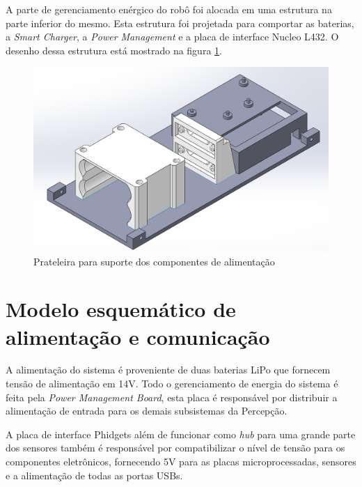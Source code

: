 	
	
	A parte de gerenciamento enérgico do robô foi alocada em uma estrutura na parte inferior do mesmo. Esta estrutura foi projetada para comportar as baterias, a \textit{Smart Charger}, a \textit{Power Management} e a placa de interface Nucleo L432. O desenho dessa estrutura está mostrado na figura \ref{pecaaliment}.
	
	\begin{figure}[h]
		\centering
		\includegraphics[width=14cm]{Figures/pecadebaixo.png}
		\caption{Prateleira para suporte dos componentes de alimentação} \label{pecaaliment}
	\end{figure}
	
	\section{Modelo esquemático de alimentação e comunicação}
	\label{sec:modesq}
	A alimentação do sistema é proveniente de duas baterias LiPo que fornecem tensão de alimentação em 14V. Todo o gerenciamento de energia do sistema é feita pela \textit{Power Management Board}, esta placa é responsável por distribuir a alimentação de entrada para os demais subsistemas da Percepção. 
	
	A placa de interface Phidgets além de funcionar como \textit{hub} para uma grande parte dos sensores também é responsável por compatibilizar o nível de tensão para os componentes eletrônicos, fornecendo 5V para as placas microprocessadas, sensores e a alimentação de todas as portas USBs. 
	
